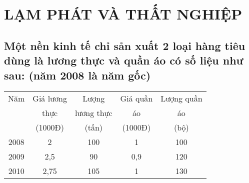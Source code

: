 \chapter{LẠM PHÁT VÀ
  THẤT NGHIỆP}

  \section{ Một nền kinh tế chỉ sản xuất 2 loại hàng tiêu dùng là lương thực và quần áo có
  số liệu như sau: (năm 2008 là năm gốc)}

\begin{tabular}{|c|c|c|c|c|}
  \hline
  Năm  & Giá lương & Lượng      & Giá quần & Lượng quần \\
       & thực      & lương thực & áo       & áo         \\
       & (1000Đ)   & (tấn)      & (1000Đ)  & (bộ)       \\
  \hline
  2008 & 2         & 100        & 1        & 100        \\
  \hline
  2009 & 2,5       & 90         & 0,9      & 120        \\
  \hline
  2010 & 2,75      & 105        & 1        & 130        \\
  \hline
\end{tabular}

